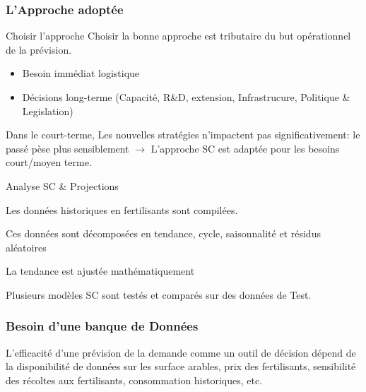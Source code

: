 \documentclass{beamer}
\begin{document}
	\begin{frame}
	\frametitle{L'Approche adoptée}
	
	\begin{block}{Choisir l'approche}
	\scriptsize{Choisir la bonne approche est tributaire du but opérationnel de la prévision.}
	\footnotesize{
	\begin{itemize}
	\item Besoin immédiat logistique
	\item Décisions long-terme (Capacité, R\&D, extension, Infrastrucure, Politique \& Legislation)
	\end{itemize}}
	\scriptsize{Dans le court-terme, Les nouvelles stratégies n'impactent pas significativement: le passé pèse plus sensiblement $\rightarrow$  L'approche SC est adaptée pour les besoins court/moyen terme.}
	\end{block}
	\begin{block}{Analyse SC \& Projections}
	\begin{itemize}
	\scriptsize{\item Les données historiques en fertilisants sont compilées.
	\item Ces données sont décomposées en tendance, cycle, saisonnalité et résidus aléatoires 
	\item La tendance est ajustée mathématiquement 
	\item Plusieurs modèles SC sont testés et comparés sur des données de Test.}
	\end{itemize}
	\end{block}
	\end{frame}
\begin{frame}
\frametitle{Besoin d'une banque de Données}
\begin{block}{}
\footnotesize{L'efficacité d'une prévision de la demande comme un outil de décision dépend de la disponibilité de données sur les surface arables, prix des fertilisants, sensibilité des récoltes aux fertilisants, consommation historiques, etc.}

\end{block}
\end{frame}
\end{document}
